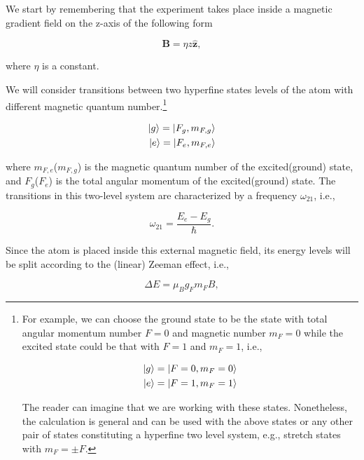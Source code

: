 \documentclass{article}
\begin{document}
We start by remembering that the experiment takes place inside a magnetic gradient field on the z-axis of the following form

\begin{equation*}
\textbf{B} = \eta z \hat{\textbf{z}},
\end{equation*}

where $\eta$ is a constant.

We will consider transitions between two hyperfine states levels of the atom with different magnetic quantum number.\footnote{For example, we can choose the ground state to be the state with total angular momentum number $F=0$ and magnetic number $m_{F}=0$ while the excited state could be that with $F=1$ and $m_{F}=1$, i.e.,

\begin{equation}
\begin{aligned}
\ket{g} = \ket{F=0, m_{F}=0} \\
\ket{e} = \ket{F=1, m_{F}=1}
\end{aligned}
\end{equation}

The reader can imagine that we are working with these states. Nonetheless, the calculation is general and can be used with the above states or any other pair of states constituting a hyperfine two level system, e.g., stretch states with $m_{F}=\pm F$.}

\begin{equation}\label{hyperfine_levels}
\begin{aligned}
\ket{g} = \ket{F_{g}, m_{F, g}} \\
\ket{e} = \ket{F_{e}, m_{F, e}}
\end{aligned}
\end{equation}

where $m_{F, e}$($m_{F, g}$) is the magnetic quantum number of the excited(ground) state, and $F_{g}$($F_{e}$) is the total angular momentum of the excited(ground) state.
The transitions in this two-level system are characterized by a frequency  $\omega_{21}$, i.e.,

\begin{equation}
  \omega_{21} = \frac{E_{e}-E_{g}}{\hbar}.
\end{equation}

Since the atom is placed inside this external magnetic field, its energy levels will be split according to the (linear) Zeeman effect, i.e.,

\begin{equation}
  \Delta E = \mu_{B} g_{F} m_{F} B,
\end{equation}
\end{document}
